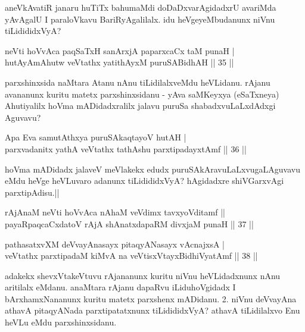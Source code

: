 \begin{artha}
aneVkAvatiR janaru huTiTx bahumaMdi doDaDxvarAgidadxrU avariMda 
yAvAgalU I paraloVkavu BariRyAgalilalx. idu heVgeyeMbudanunx niVnu 
tiLidididxVyA?
\end{artha}


\begin{shl}
neVti hoVvAca paqSaTxH sanArxjA paparxcaCx taM punaH | \\
hutAyAmAhutw veVtathx yatithAyxM puruSABidhAH \hfill|| 35 || 
\end{shl}

\begin{artha}
parxshinxsida naMtara Atanu nAnu tiLidilalxveMdu heVLidanu. rAjanu 
avananunx kuritu matetx parxshinxsidanu - yAva saMKeyxya (eSaTxneya) 
Ahutiyalilx hoVma mADidadxralilx jalavu puruSa shabadxvuLaLxdAdxgi 
Aguvavu?
\end{artha}


\begin{shl}
Apa Eva samutAthxya puruSAkaqtayoV hutAH | \\
parxvadanitx yathA veVtathx tathA\s \s shu parxtipadayxtAmf \hfill|| 36 || 
\end{shl}

\begin{artha}
hoVma mADidadx jalaveV meVlakekx edudx puruSAkAravuLaLxvugaLAguvavu 
eMdu heVge heVLuvaro adanunx tiLidididxVyA? hAgidadxre shiVGarxvAgi 
parxtipAdisu.||
\end{artha}

\begin{shl}
rAjAnaM neVti hoVvAca nAhaM veVdimx tavxyoVditamf || \\
payaRpaqcaCxdatoV rAjA shAnatxdapaRM divxjaM punaH \hfill|| 37 || 
\end{shl}

\begin{shl}
pathasatxvXM deVvayAnasayx pitaqyANasayx vA\s cnajxsA | \\
veVtathx parxtipadaM kiMvA na veVtisxVtayxBidhiVyatAmf \hfill|| 38 || 
\end{shl}

\begin{artha}
adakekx shevxVtakeVtuvu rAjananunx kuritu niVnu heVLidadxnunx nAnu 
aritilalx eMdanu. anaMtara rAjanu dapaRvu iLiduhoVgidadx I 
bArxhamxNananunx kuritu matetx parxshenx mADidanu. 2. niVnu deVvayAna 
athavA pitaqyANada parxtipatatxnunx tiLidididxVyA? athavA tiLidilalxvo 
Enu heVLu eMdu parxshinxsidanu.
\end{artha}

